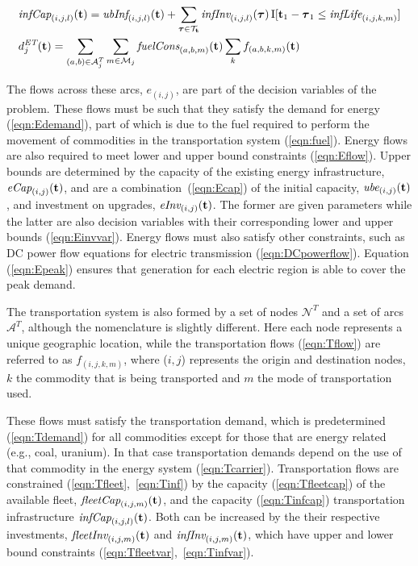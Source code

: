 \documentclass{article}
\begin{document}
{\begin{align}
& \emph{infCap}_{(i,j,l)}(\textbf{t}) = \emph{ubInf}_{(i,j,l)}(\textbf{t}) + \sum_{\boldsymbol\tau \in \mathcal{T}_\textbf{t}}{\emph{infInv}_{(i,j,l)}(\boldsymbol\tau)} \, \textup{I}[\textbf{t}_1 - \boldsymbol\tau_1 \le \emph{infLife}_{(i,j,k,m)}] \label{eqn:Tinfcap} \\
& d^\emph{ET}_j(\textbf{t}) = \sum_{(a,b) \in \mathcal{A}^T_j}{ \sum_{m \in \mathcal{M}_j}{ \emph{fuelCons}_{(a,b,m)}(\textbf{t}) \sum_k{ f_{(a,b,k,m)}(\textbf{t}) } } } \label{eqn:fuel}
\end{align}
}


The flows across these arcs,  $e_{(i,j)}$, are part of the decision variables of the problem. These flows must be such that they satisfy the demand for energy (\ref{eqn:Edemand}), part of which is due to the fuel required to perform the movement of commodities in the transportation system (\ref{eqn:fuel}). Energy flows are also required to meet lower and upper bound constraints (\ref{eqn:Eflow}). Upper bounds are determined by the capacity of the existing energy infrastructure, $\emph{eCap}_{(i,j)}(\textbf{t})$, and are a combination~(\ref{eqn:Ecap}) of the initial capacity, $\emph{ube}_{(i,j)}(\textbf{t})$, and investment on upgrades, $\emph{eInv}_{(i,j)}(\textbf{t})$. The former are given parameters while the latter are also decision variables with their corresponding lower and upper bounds (\ref{eqn:Einvvar}). Energy flows must also satisfy other constraints, such as DC power flow equations for electric transmission (\ref{eqn:DCpowerflow}). Equation (\ref{eqn:Epeak}) ensures that generation for each electric region is able to cover the peak demand.

The transportation system is also formed by a set of nodes $\mathcal{N}^T$ and a set of arcs $\mathcal{A}^T$, although the nomenclature is slightly different. Here each node represents a unique geographic location, while the transportation flows (\ref{eqn:Tflow}) are referred to as $f_{(i,j,k,m)}$, where ($i,j$) represents the origin and destination nodes, $k$ the commodity that is being transported and $m$ the mode of transportation used.

These flows must satisfy the transportation demand, which is predetermined (\ref{eqn:Tdemand}) for all commodities except for those that are energy related (e.g., coal, uranium). In that case transportation demands depend on the use of that commodity in the energy system (\ref{eqn:Tcarrier}). Transportation flows are constrained (\ref{eqn:Tfleet},~\ref{eqn:Tinf}) by the capacity (\ref{eqn:Tfleetcap}) of the available fleet, $\emph{fleetCap}_{(i,j,m)}(\textbf{t})$, and the capacity (\ref{eqn:Tinfcap}) transportation infrastructure $\emph{infCap}_{(i,j,l)}(\textbf{t})$. Both can be increased by the their respective investments,  $\emph{fleetInv}_{(i,j,m)}(\textbf{t})$ and $\emph{infInv}_{(i,j,m)}(\textbf{t})$, which have upper and lower bound constraints (\ref{eqn:Tfleetvar},~\ref{eqn:Tinfvar}).
\end{document}
